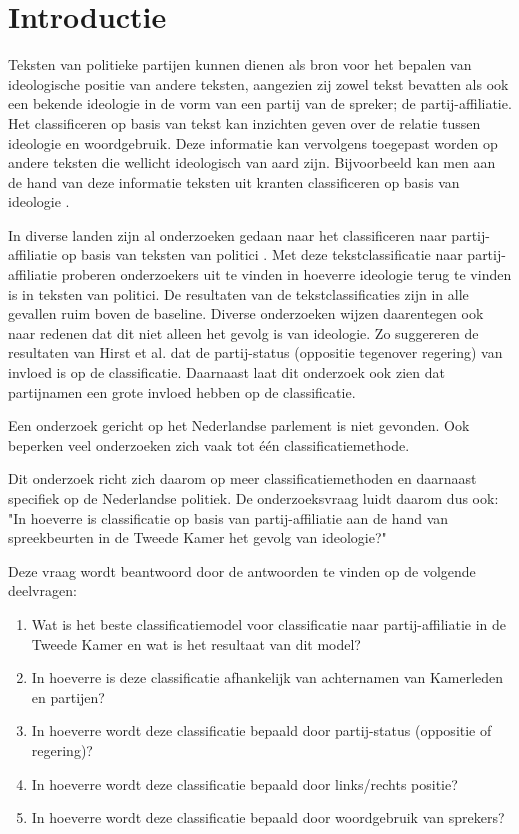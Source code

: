 \section{Introductie}
\label{sec:intro}
Teksten van politieke partijen kunnen dienen als bron voor het bepalen van ideologische positie van andere teksten, aangezien zij zowel tekst bevatten als ook een bekende ideologie in de vorm van een partij van de spreker; de partij-affiliatie. Het classificeren op basis van tekst kan inzichten geven over de relatie tussen ideologie en woordgebruik. Deze informatie kan vervolgens toegepast worden op andere teksten die wellicht ideologisch van aard zijn. Bijvoorbeeld kan men aan de hand van deze informatie teksten uit kranten classificeren op basis van ideologie \cite{DBLP:journals/corr/Biessmann16,Hirst_textto}.\par
In diverse landen zijn al onderzoeken gedaan naar het classificeren naar partij-affiliatie op basis van teksten van politici \cite{DBLP:journals/corr/Biessmann16,Ferreira2016UsingTT}. Met deze tekstclassificatie naar partij-affiliatie proberen onderzoekers uit te vinden in hoeverre ideologie terug te vinden is in teksten van politici. De resultaten van de tekstclassificaties zijn in alle gevallen ruim boven de baseline. Diverse onderzoeken wijzen daarentegen ook naar redenen dat dit niet alleen het gevolg is van ideologie. Zo suggereren de  resultaten van Hirst et al. \cite{Hirst_textto} dat de partij-status (oppositie tegenover regering) van invloed is op de classificatie. Daarnaast laat dit onderzoek ook zien dat partijnamen een grote invloed hebben op de classificatie.\par
Een onderzoek gericht op het Nederlandse parlement is niet gevonden. Ook beperken veel onderzoeken zich vaak tot één classificatiemethode.\par
Dit onderzoek richt zich daarom op meer classificatiemethoden en daarnaast specifiek op de Nederlandse politiek. De onderzoeksvraag luidt daarom dus ook: "In hoeverre is classificatie op basis van partij-affiliatie aan de hand van spreekbeurten in de Tweede Kamer het gevolg van ideologie?"\par
Deze vraag wordt beantwoord door de antwoorden te vinden op de volgende deelvragen:
\begin{enumerate}
    \item Wat is het beste classificatiemodel voor classificatie naar partij-affiliatie in de Tweede Kamer en wat is het resultaat van dit model?
    \item In hoeverre is deze classificatie afhankelijk van achternamen van Kamerleden en partijen?
    \item In hoeverre wordt deze classificatie bepaald door partij-status (oppositie of regering)?
    \item In hoeverre wordt deze classificatie bepaald door links/rechts positie?
    \item In hoeverre wordt deze classificatie bepaald door woordgebruik van sprekers?
\end{enumerate}
